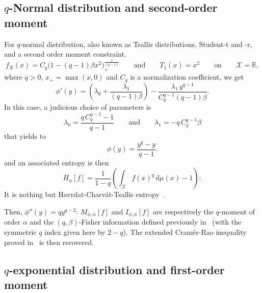 \documentclass[english,sort&compress]{elsarticle}
\theoremstyle{definition}
\theoremstyle{plain}
\theoremstyle{plain}
\def\dmu{\mathrm{d}\mu}
\def\Rset{\mathbb{R}}
\def\X{\mathcal{X}}
\begin{document}

\subsection{$q$-Normal distribution and second-order moment}
\label{subsec:qNormalSecondOrder}

For $q$-normal distribution, also  known as Tsallis distributions, Student-t and
-r, and a second order moment constraint,
%
\[
f_X(x)  = C_q  \Big( 1  - (q-1)  \beta x^2  \Big)_{\!+}^{\frac{1}{(q-1)}} \qquad
\mbox{and} \qquad T_1(x) = x^2 \qquad \mbox{on} \qquad \X = \Rset,
\]
%
where $q  > 0$, $x_+ = \max(x,0)$  and $C_q$ is a  normalization coefficient, we
get
%
\[
\phi'(y)  =   \left(  \lambda_0   +  \frac{\lambda_1}{(q-1)  \beta}   \right)  -
\frac{\lambda_1 \, y^{q-1}}{C_q^{q-1} (q-1) \beta}.
\]
%
In this case, a judicious choice of parameters is
%
\[
\lambda_0 = \frac{q \, C_q^{q-1}  - 1}{q-1} \qquad \mbox{and} \qquad \lambda_1 =
-q \, C_q^{q-1} \beta
\]
%
that yields to 
%
\[
\phi(y) = \frac{y^q-y}{q-1}.
\]
%
and an associated entropy is then 
%
\[
H_\phi[f] = \frac{1}{1-q} \left( \int_\X f(x)^q \, \dmu(x) - 1 \right):
\]
%
It  is  nothing  but  Havrdat-Charv\'at-Tsallis  entropy~\cite{HavCha67,  Dar70,
  Tsa88, CosHer03}.

Then, $\phi''(y) = q y^{q-2}$: $M_{\phi,\alpha}[f]$ and $I_{\phi,\alpha}[f]$ are
respectively  the  $q$-moment  of  order  $\alpha$  and  the  $(q,\beta)$-Fisher
information defined previously in~\cite{LutYan05, LutYan07, LutLv12, Ber12:06_1,
  Ber12:06_2, Ber13}  (with the symmetric  $q$ index  given here by  $2-q$). The
extended Cram\'er-Rao inequality proved in~\cite{LutYan05, Ber12:06_2, Ber13} is
then recovered.



\subsection{$q$-exponential distribution and first-order moment}
\label{subsec:qExponentialFirstOrder}
\end{document}
